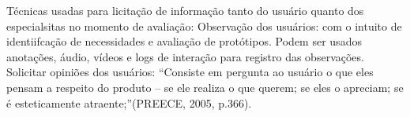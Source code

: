 	Técnicas usadas para licitação de informação tanto do usuário quanto dos especialsitas no momento de avaliação:
Observação dos usuários: com o intuito de identiifcação de necessidades e avaliação de protótipos. Podem ser usados anotações, áudio, vídeos e logs de interação para registro das observações. 
Solicitar opiniões dos usuários: “Consiste em pergunta ao usuário o que eles pensam a respeito do produto – se ele realiza o que querem; se eles o apreciam; se é esteticamente atraente;”(PREECE, 2005, p.366). 
